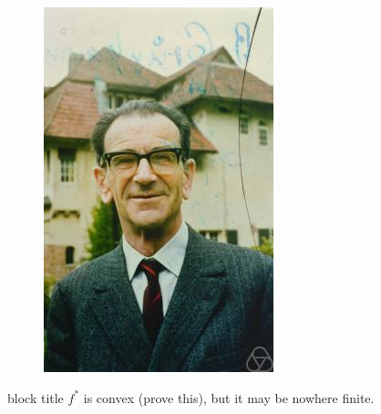 \documentclass[aspectratio=169,xcolor=dvipsnames,11pt]{beamer}
\begin{document}
\begin{frame}
\begin{minipage}{0.3\linewidth}
\begin{figure}
{\begin{minipage}[b]{0.45\textwidth}
  \end{minipage}}%
  \hfill
  \begin{minipage}[b]{0.46\textwidth}
    \includegraphics[width=\linewidth]{figures/Werner_Fenchel.jpeg}
  \end{minipage}
\end{figure}

\end{minipage}
\begin{beamercolorbox}[rounded=true, shadow=true, wd=\textwidth]{block title}\centering
$f^*$ is convex (prove this), but it may be nowhere finite.
\end{beamercolorbox}
\end{frame}
\end{document}

